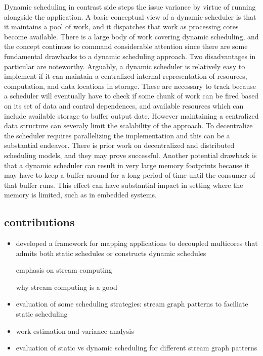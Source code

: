 Dynamic scheduling in contrast side steps the issue variance by virtue
of running alongside the application. A basic conceptual view of a
dynamic scheduler is that it maintains a pool of work, and it
dispatches that work as processing cores become available. There is a
large body of work covering dynamic scheduling, and the concept
continues to command considerable attention since there are some
fundamental drawbacks to a dynamic scheduling approach. Two
disadvantages in particular are noteworthy. Arguably, a dynamic
scheduler is relatively easy to implement if it can maintain a
centralized internal representation of resources, computation, and
data locations in storage. These are necessary to track because a
scheduler will eventually have to check if some chunk of work can be
fired based on its set of data and control dependences, and available
resources which can include available storage to buffer output date.
However maintaining a centralized data structure can severaly limit
the scalability of the approach. To decentralize the scheduler
requires parallelizing the implementation and this can be a
substantial endeavor. There is prior work on decentralized and
distributed scheduling models, and they may prove successful.
Another potential drawback is that a dynamic scheduler can result in
very large memory footprints because it may have to keep a buffer
around for a long period of time until the consumer of that buffer
runs. This effect can have substantial impact in setting where the
memory is limited, such as in embedded systems.

\subsection{contributions}

\begin{itemize}

\item developed a framework for mapping applications to decoupled
  multicores that admits both static schedules or constructs dynamic schedules

emphasis on stream computing

why stream computing is a good 

\item evaluation of some scheduling strategies: stream graph patterns
  to faciliate static scheduling

\item work estimation and variance analysis

\item evaluation of static vs dynamic scheduling for different stream
  graph patterns

\end{itemize}

